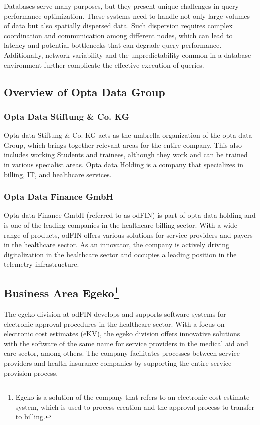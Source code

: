 Databases serve many purposes, but they present unique challenges in query performance optimization. These systems need to handle not only large volumes of data but also spatially dispersed data. Such dispersion requires complex coordination and communication among different nodes, which can lead to latency and potential bottlenecks that can degrade query performance. Additionally, network variability and the unpredictability common in a database environment further complicate the effective execution of queries.

\subsection{Overview of Opta Data Group}
\subsubsection{Opta Data Stiftung \& Co. KG }
Opta data Stiftung \& Co. KG acts as the umbrella organization of the opta data Group, which brings together relevant areas for the entire company. This also includes working Students and trainees, although they work and can be trained in various specialist areas. Opta data Holding is a company that specializes in billing, IT, and healthcare services.

\subsubsection{Opta Data Finance GmbH  }
Opta data Finance GmbH (referred to as odFIN) is part of opta data holding and is one of the leading companies in the healthcare billing sector. With a wide range of products, odFIN offers various solutions for service providers and payers in the healthcare sector. As an innovator, the company is actively driving digitalization in the healthcare sector and occupies a leading position in the telemetry infrastructure.

\subsection{Business Area Egeko\protect\footnote{Egeko is a solution of the company that refers to an electronic cost estimate system, which is used to process creation and the approval process to transfer to billing.}}

The egeko division at odFIN develops and supports software systems for electronic approval procedures in the healthcare sector. With a focus on electronic cost estimates (eKV), the egeko division offers innovative solutions with the software of the same name for service providers in the medical aid and care sector, among others. The company facilitates processes between service providers and health insurance companies by supporting the entire service provision process.\vspace{.4cm}

